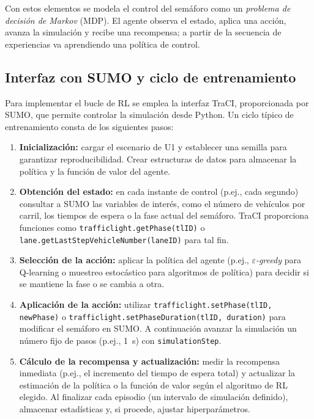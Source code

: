 Con estos elementos se modela el control del semáforo como un
\emph{problema de decisión de Markov} (MDP). El agente observa el
estado, aplica una acción, avanza la simulación y recibe una
recompensa; a partir de la secuencia de experiencias va aprendiendo
una política de control.

\subsection*{Interfaz con SUMO y ciclo de entrenamiento}

Para implementar el bucle de RL se emplea la interfaz TraCI,
proporcionada por SUMO, que permite controlar la simulación desde
Python. Un ciclo típico de entrenamiento consta de los siguientes
pasos:

\begin{enumerate}
  \item \textbf{Inicialización:} cargar el escenario de U1 y
    establecer una semilla para garantizar reproducibilidad. Crear
    estructuras de datos para almacenar la política y la función de
    valor del agente.
  \item \textbf{Obtención del estado:} en cada instante de control
    (p.ej., cada segundo) consultar a SUMO las variables de interés,
    como el número de vehículos por carril, los tiempos de espera o
    la fase actual del semáforo. TraCI proporciona funciones como
    \verb|trafficlight.getPhase(tlID)| o
    \verb|lane.getLastStepVehicleNumber(laneID)| para tal fin.
  \item \textbf{Selección de la acción:} aplicar la política del
    agente (p.ej., \emph{$\varepsilon$-greedy} para Q-learning o
    muestreo estocástico para algoritmos de política) para decidir si
    se mantiene la fase o se cambia a otra.
  \item \textbf{Aplicación de la acción:} utilizar
    \verb|trafficlight.setPhase(tlID, newPhase)| o
    \verb|trafficlight.setPhaseDuration(tlID, duration)| para
    modificar el semáforo en SUMO. A continuación avanzar la
    simulación un número fijo de pasos (p.ej., 1~s) con
    \verb|simulationStep|.
  \item \textbf{Cálculo de la recompensa y actualización:} medir la
    recompensa inmediata (p.ej., el incremento del tiempo de espera
    total) y actualizar la estimación de la política o la función de
    valor según el algoritmo de RL elegido.  Al finalizar cada
    episodio (un intervalo de simulación definido), almacenar
    estadísticas y, si procede, ajustar hiperparámetros.
\end{enumerate}

